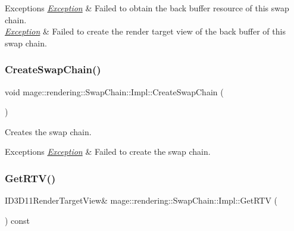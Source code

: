 \begin{DoxyExceptions}{Exceptions}
{\em \mbox{\hyperlink{classmage_1_1_exception}{Exception}}} & Failed to obtain the back buffer resource of this swap chain. \\
\hline
{\em \mbox{\hyperlink{classmage_1_1_exception}{Exception}}} & Failed to create the render target view of the back buffer of this swap chain. \\
\hline
\end{DoxyExceptions}
\mbox{\label{classmage_1_1rendering_1_1_swap_chain_1_1_impl_a990a602cf4639daa85210b4cbd1e525e}} 
\subsubsection{\texorpdfstring{Create\+Swap\+Chain()}{CreateSwapChain()}}
{\footnotesize\ttfamily void mage\+::rendering\+::\+Swap\+Chain\+::\+Impl\+::\+Create\+Swap\+Chain (\begin{DoxyParamCaption}{ }\end{DoxyParamCaption})\hspace{0.3cm}{\ttfamily [private]}}

Creates the swap chain.


\begin{DoxyExceptions}{Exceptions}
{\em \mbox{\hyperlink{classmage_1_1_exception}{Exception}}} & Failed to create the swap chain. \\
\hline
\end{DoxyExceptions}
\mbox{\label{classmage_1_1rendering_1_1_swap_chain_1_1_impl_ac105ebcc013364c86cd8a7184d96df5f}} 
\subsubsection{\texorpdfstring{Get\+R\+T\+V()}{GetRTV()}}
{\footnotesize\ttfamily I\+D3\+D11\+Render\+Target\+View\& mage\+::rendering\+::\+Swap\+Chain\+::\+Impl\+::\+Get\+R\+TV (\begin{DoxyParamCaption}{ }\end{DoxyParamCaption}) const\hspace{0.3cm}{\ttfamily [noexcept]}}

